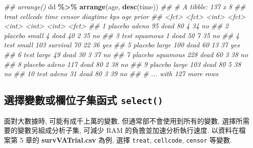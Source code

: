 \documentclass[
]{book}
\newenvironment{Shaded}{\begin{snugshade}}{\end{snugshade}}
\newcommand{\CommentTok}[1]{\textcolor[rgb]{0.56,0.35,0.01}{\textit{#1}}}
\newcommand{\KeywordTok}[1]{\textcolor[rgb]{0.13,0.29,0.53}{\textbf{#1}}}
\newcommand{\NormalTok}[1]{#1}
\newcommand{\OperatorTok}[1]{\textcolor[rgb]{0.81,0.36,0.00}{\textbf{#1}}}
\newcommand{\StringTok}[1]{\textcolor[rgb]{0.31,0.60,0.02}{#1}}
\begin{document}
\begin{Shaded}
\begin{Highlighting}[]
\CommentTok{\#\# arrange()}
\NormalTok{dd }\OperatorTok{\%\textgreater{}\%}\StringTok{ }
\StringTok{  }\KeywordTok{arrange}\NormalTok{(age, }\KeywordTok{desc}\NormalTok{(time))}
\CommentTok{\#\# \# A tibble: 137 x 8}
\CommentTok{\#\#    treat   cellcode  time censor   diagtime   kps   age prior}
\CommentTok{\#\#    \textless{}fct\textgreater{}   \textless{}fct\textgreater{}    \textless{}int\textgreater{} \textless{}fct\textgreater{}       \textless{}int\textgreater{} \textless{}int\textgreater{} \textless{}int\textgreater{} \textless{}fct\textgreater{}}
\CommentTok{\#\#  1 placebo adeno       95 dead           80     4    34 no   }
\CommentTok{\#\#  2 placebo small        4 dead           40     2    35 no   }
\CommentTok{\#\#  3 test    squamous     1 dead           50     7    35 no   }
\CommentTok{\#\#  4 test    small      103 survival       70    22    36 yes  }
\CommentTok{\#\#  5 placebo large      100 dead           60    13    37 yes  }
\CommentTok{\#\#  6 test    large       49 dead           30     3    37 no   }
\CommentTok{\#\#  7 placebo squamous   228 dead           60     3    38 no   }
\CommentTok{\#\#  8 placebo adeno      117 dead           80     2    38 no   }
\CommentTok{\#\#  9 placebo large      103 dead           80     5    38 no   }
\CommentTok{\#\# 10 test    adeno       31 dead           80     3    39 no   }
\CommentTok{\#\# \# ... with 127 more rows}
\end{Highlighting}
\end{Shaded}

\hypertarget{ux9078ux64c7ux8b8aux6578ux6216ux6b04ux4f4dux5b50ux96c6ux51fdux5f0f-select}{%
\subsection{\texorpdfstring{選擇變數或欄位子集函式 \texttt{select()}}{選擇變數或欄位子集函式 select()}}\label{ux9078ux64c7ux8b8aux6578ux6216ux6b04ux4f4dux5b50ux96c6ux51fdux5f0f-select}}

面對大數據時, 可能有成千上萬的變數,
但通常部不會使用到所有的變數,
選擇所需要的變數另組成分析子集,
可減少 RAM 的負擔並加速分析執行速度.
以資料在檔案第 5 章的 \textbf{survVATrial.csv} 為例,
選擇 \texttt{treat}, \texttt{cellcode}, \texttt{censor} 等變數.
\end{document}
